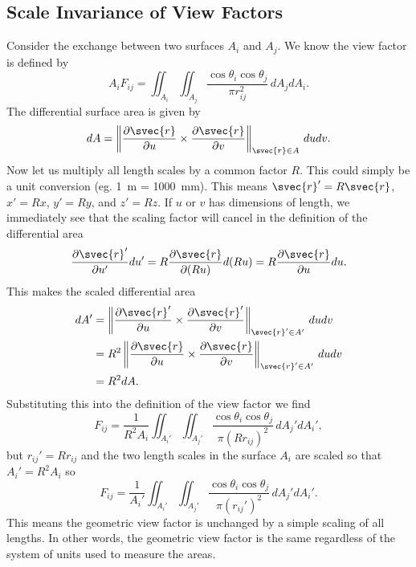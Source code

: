 \subsection{Scale Invariance of View Factors}
Consider the exchange between two surfaces \(A_i\) and \(A_j\).  We know
the view factor is defined by
\begin{equation}
    A_iF_{ij} = \iint_{A_i}\iint_{A_j} 
    \frac{\cos\theta_i\cos\theta_j}{\pi r_{ij}^2}
    \,dA_jdA_i.
\end{equation}
The differential surface area is given by~\cite{tai_generalized_1997}
\begin{equation}
    dA = \left\lVert \frac{\partial \svec{r}}{\partial u} \times
    \frac{\partial\svec{r}}{\partial v} \right\rVert_{\svec{r}\in A}
    \,dudv.
\end{equation}
Now let us multiply all length scales by a common factor \(R\).  This
could simply be a unit conversion (eg. \SI{1}{\metre} =
\SI{1000}{\milli\metre}).  This means \(\svec{r}' = R\svec{r}\), \(x' =
Rx\), \(y' = Ry\), and \(z' = Rz\).  If \(u\) or \(v\) has dimensions of
length, we immediately see that the scaling factor will cancel in the
definition of the differential area 
\begin{equation}
    \frac{\partial\svec{r}'}{\partial u'}du' =
    R\frac{\partial\svec{r}}{\partial (Ru)} d(Ru) =
    R\frac{\partial\svec{r}}{\partial u} du.
\end{equation}
This makes the scaled differential area
\begin{align}
    dA' &= \left\lVert \frac{\partial \svec{r}'}{\partial u} \times
    \frac{\partial\svec{r}'}{\partial v} \right\rVert_{\svec{r}'\in A'}
    \,dudv 
    \nonumber \\
    &= R^2 \left\lVert \frac{\partial \svec{r}}{\partial u} \times
    \frac{\partial\svec{r}}{\partial v} \right\rVert_{\svec{r}'\in A'}
    \,dudv 
    \nonumber \\
    &= R^2 dA.
\end{align}
Substituting this into the definition of the view factor we find
\begin{equation}
    F_{ij} = \frac{1}{R^2A_i} \iint_{A_i'} \iint_{A_j'}
    \frac{\cos\theta_i\cos\theta_j}{\pi (Rr_{ij})^2} \,dA_j'dA_i',
\end{equation}
but \(r_{ij}' = Rr_{ij}\) and the two length scales in the surface
\(A_i\) are scaled so that \(A_i' = R^2A_i\) so 
\begin{equation}
    F_{ij} = \frac{1}{A_i'} \iint_{A_i'} \iint_{A_j'}
    \frac{\cos\theta_i\cos\theta_j}{\pi (r_{ij}')^2} \,dA_j'dA_i'.
\end{equation}
This means the geometric view factor is unchanged by a simple scaling of
all lengths.  In other words, the geometric view factor is the same
regardless of the system of units used to measure the areas.


